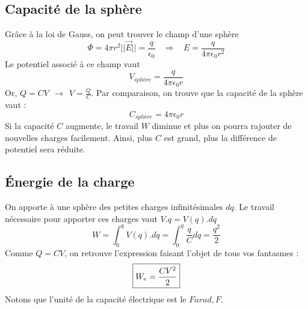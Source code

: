 \documentclass	[11pt, a4paper, openany]{book}
\begin{document}
\subsection{Capacité de la sphère}
Grâce à la loi de Gauss, on peut trouver le champ d'une sphère 
\begin{equation}
	\Phi = 4\pi r^2 ||\vec{E}|| = \frac{q}{\epsilon_0}\ \ \ \ \Rightarrow\ \ \ \ E = \frac{q}{4\pi \epsilon_0 r^2}
\end{equation}
Le potentiel associé à ce champ vaut 
\begin{equation}
	V_{sphère} = \frac{q}{4\pi \epsilon_0 r}
\end{equation}
Or, $Q = CV\ \ \rightarrow\ \ V = \frac{Q}{C}$. Par comparaison, on trouve que la capacité de la sphère vaut :
\begin{equation}
	C_{sphère} = 4\pi \epsilon_0 r
\end{equation}
Si la capacité $C$ augmente, le travail $W$ diminue et plus on pourra rajouter de nouvelles charges facilement. Ainsi, plus $C$ est grand, plus la différence de potentiel sera réduite.

\subsection{Énergie de la charge}
On apporte à une sphère des petites charges infinitésimales $dq$. Le travail nécessaire pour apporter ces charges vaut $V.q = V(q).dq$
\begin{equation}
	W = \int_0^q V(q).dq = \int_0^q \frac{q}{C}dq = \frac{q^2}{2} 
\end{equation}
Comme $Q = CV$, on retrouve l'expression faisant l'objet de tous vos fantasmes :
\begin{equation}
	\fbox{$W_e = \dfrac{CV^2}{2}$}
\end{equation}
Notons que l'unité de la capacité électrique est le $Farad, F$.
\end{document}
